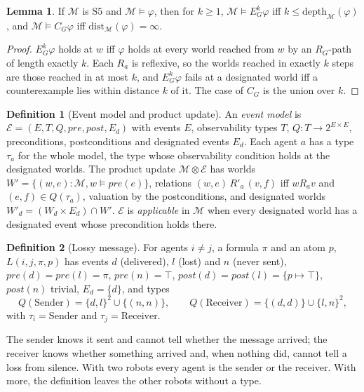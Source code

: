 \documentclass[11pt,a4paper]{article}
\theoremstyle{definition}
\newtheorem{definition}{Definition}
\newtheorem{lemma}{Lemma}
\newcommand{\Mod}{\mathcal{M}}
\newcommand{\Ev}{\mathcal{E}}
\newcommand{\prd}{\otimes}
\newcommand{\Eop}[1]{E_{#1}}
\newcommand{\Cop}[1]{C_{#1}}
\newcommand{\pre}{\mathit{pre}}
\newcommand{\post}{\mathit{post}}
\newcommand{\dist}{\mathrm{dist}}
\newcommand{\depth}{\mathrm{depth}}
\begin{document}
\begin{lemma}
\label{lem:depth}
If $\Mod$ is $\mathrm{S5}$ and $\Mod \models \varphi$, then for $k \geq 1$,
$\Mod \models \Eop{G}^k\varphi$ iff $k \leq \depth_\Mod(\varphi)$, and
$\Mod \models \Cop{G}\varphi$ iff $\dist_\Mod(\varphi) = \infty$.
\end{lemma}

\begin{proof}
$\Eop{G}^k\varphi$ holds at $w$ iff $\varphi$ holds at every world reached from
$w$ by an $R_G$-path of length exactly $k$. Each $R_a$ is reflexive, so the
worlds reached in exactly $k$ steps are those reached in at most $k$, and
$\Eop{G}^k\varphi$ fails at a designated world iff a counterexample lies within
distance $k$ of it. The case of $\Cop{G}$ is the union over $k$.
\end{proof}

\begin{definition}[Event model and product update]
An \emph{event model} is $\Ev = (E, T, Q, \pre, \post, E_d)$ with events $E$,
observability types $T$, $Q : T \to 2^{E\times E}$, preconditions, postconditions
and designated events $E_d$. Each agent $a$ has a type $\tau_a$ for the whole
model, the type whose observability condition holds at the designated worlds.
The product update $\Mod \prd \Ev$ has worlds
$W' = \{(w,e) : \Mod, w \models \pre(e)\}$, relations
$(w,e)\, R'_a\, (v,f)$ iff $w R_a v$ and $(e,f) \in Q(\tau_a)$, valuation by the
postconditions, and designated worlds $W'_d = (W_d \times E_d) \cap W'$. $\Ev$
is \emph{applicable} in $\Mod$ when every designated world has a designated
event whose precondition holds there.
\end{definition}

\begin{definition}[Lossy message]
\label{def:lossy}
For agents $i \neq j$, a formula $\pi$ and an atom $p$, $L(i,j,\pi,p)$ has
events $d$ (delivered), $l$ (lost) and $n$ (never sent),
$\pre(d) = \pre(l) = \pi$, $\pre(n) = \top$, $\post(d) = \post(l) =
\{p \mapsto \top\}$, $\post(n)$ trivial, $E_d = \{d\}$, and types
\[
  Q(\mathrm{Sender}) = \{d,l\}^2 \cup \{(n,n)\},\qquad
  Q(\mathrm{Receiver}) = \{(d,d)\} \cup \{l,n\}^2,
\]
with $\tau_i = \mathrm{Sender}$ and $\tau_j = \mathrm{Receiver}$.
\end{definition}

\noindent
The sender knows it sent and cannot tell whether the message arrived; the
receiver knows whether something arrived and, when nothing did, cannot tell a
loss from silence. With two robots every agent is the sender or the receiver.
With more, the definition leaves the other robots without a type.
\end{document}
